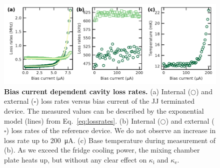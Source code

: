 \begin{figure}
	\centering
	\includegraphics[width=\linewidth]{chapter-currentdetection/figures/SM_lossrates}
	\caption{
		\textbf{Bias current dependent cavity loss rates.}
		(a) Internal ($\bigcirc$) and external ($\square$) loss rates versus bias current of the JJ terminated device. The measured values can be described by the exponential model (lines) from Eq.~\eqref{eq:lossrates}.
		(b) Internal ($\bigcirc$) and external ($\square$) loss rates of the reference device.
		We do not observe an increase in loss rate up to \SI{200}{\micro\ampere}.
		(c) Base temperature during measurement of (b).
		As we exceed the fridge cooling power, the mixing chamber plate heats up, but without any clear effect on $\kappa_\text{i}$ and $\kappa_\text{e}$.
	}
	\label{fig:lossratesvscurrent}
\end{figure}

